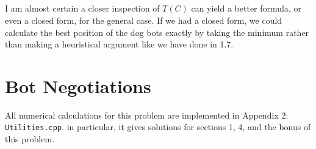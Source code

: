 \documentclass{article}
\begin{document}
\subsection{}
I am almost certain a closer inspection of $T(C)$ can yield a better formula, or even a closed form, for the general case. If we had a closed form, we could calculate the best position of the dog bots exactly by taking the minimum rather than making a heuristical argument like we have done in 1.7.

\section{Bot Negotiations}
All numerical calculations for this problem are implemented in Appendix 2: \verb|Utilities.cpp|. in particular, it gives solutions for sections 1, 4, and the bonus of this problem.
\end{document}
